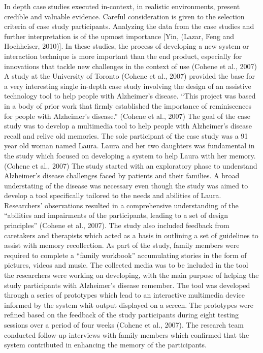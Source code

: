 In depth case studies executed in-context, in realistic environments, present credible and valuable evidence.  Careful consideration is given to the selection criteria of case study participants. Analyzing the data from the case studies and further interpretation is of the upmost importance [Yin, (Lazar, Feng and Hochheiser, 2010)].
In these studies, the process of developing a new system or interaction technique is more important than the end product, especially for innovations that tackle new challenges in the context of use (Cohene et al., 2007)
A study at the University of Toronto (Cohene et al., 2007) provided the base for a very interesting single in-depth case study involving the design of an assistive technology tool to help people with Alzheimer’s disease. “This project was based in a body of prior work that firmly established the importance of reminiscences for people with Alzheimer’s disease.” (Cohene et al., 2007) The goal of the case study was to develop a multimedia tool to help people with Alzheimer’s disease recall and relive old memories. The sole participant of the case study was a 91 year old woman named Laura. Laura and her two daughters was fundamental in the study which focused on developing a system to help Laura with her memory. (Cohene et al., 2007) 
The study started with an exploratory phase to understand Alzheimer’s disease challenges faced by patients and their families. A broad understating of the disease was necessary even though the study was aimed to develop a tool specifically tailored to the needs and abilities of Laura.  Researchers’ observations resulted in a comprehensive understanding of the “abilities and impairments of the participants, leading to a set of design principles” (Cohene et al., 2007). The study also included feedback from caretakers and therapists which acted as a basis in outlining a set of guidelines to assist with memory recollection. As part of the study, family members were required to complete a “family workbook” accumulating stories in the form of pictures, videos and music.  The collected media was to be included in the tool the researchers were working on developing, with the main purpose of helping the study participants with Alzheimer’s disease remember.   
The tool was developed through a series of prototypes which lead to an interactive multimedia device informed by the system whit output displayed on a screen.  The prototypes were refined based on the feedback of the study participants during eight testing sessions over a period of four weeks (Cohene et al., 2007). 
The research team conducted follow-up interviews with family members which confirmed that the system contributed in enhancing the memory of the participants. 
